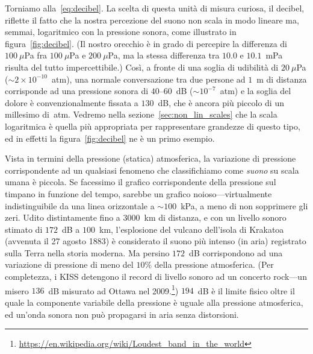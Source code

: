 \begin{figure}[htb!]
\end{figure}

Torniamo alla~\eqref{eq:decibel}. La scelta di questa unità di misura curiosa,
il decibel, riflette il fatto che la nostra percezione del suono non scala
in modo lineare ma, semmai, logaritmico con la pressione sonora, come
illustrato in figura~\ref{fig:decibel}. (Il nostro orecchio è in grado di
percepire la differenza di $100~\mu$Pa fra $100~\mu$Pa e $200~\mu$Pa, ma la
stessa differenza tra $10.0$ e $10.1$~mPa risulta del tutto impercettibile.)
Così, a fronte di una soglia di udibilità di $20~\mu$Pa
($\sim 2\times10^{-10}$~atm), una normale conversazione tra due persone ad
$1$~m di distanza corrisponde ad una pressione sonora di $40$--$60$~dB
($\sim 10^{-7}$~atm) e la soglia del dolore è convenzionalmente
fissata a $130$~dB, che è ancora più piccolo di un millesimo di~atm.
Vedremo nella sezione~\ref{sec:non_lin_scales} che la scala logaritmica è
quella più appropriata per rappresentare grandezze di questo tipo, ed in
effetti la figura~\ref{fig:decibel} ne è un primo esempio.

Vista in termini della pressione (statica) atmosferica, la variazione di
pressione corrispondente ad un qualsiasi fenomeno che classifichiamo come
\emph{suono} su scala umana è piccola. Se facessimo il grafico corrispondente
della pressione sul timpano in funzione del tempo, sarebbe un grafico
noioso---virtualmente indistinguibile da una linea orizzontale a $\sim 100$~kPa,
a meno di non sopprimere gli zeri.
Udito distintamente fino a $3000$~km di distanza, e con un livello sonoro
stimato di $172$~dB a $100$~km, l'esplosione del vulcano dell'isola di Krakatoa
(avvenuta il 27 agosto 1883) è considerato il suono più intenso (in aria)
registrato sulla Terra nella storia moderna. Ma persino $172$~dB corrispondono
ad una variazione di pressione di meno del $10\%$ della pressione atmosferica.
(Per completezza, i KISS detengono il record di livello sonoro ad un concerto
rock---un misero $136$~dB misurato ad Ottawa nel 2009.\footnote{\url{https://en.wikipedia.org/wiki/Loudest_band_in_the_world}})
$194$~dB è il limite fisico oltre il quale la componente variabile della
pressione è uguale alla pressione atmosferica, ed un'onda sonora non può propagarsi
in aria senza distorsioni.


